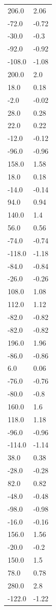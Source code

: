 \begin{longtable}{ll}
206.0 & 2.06 \\
-72.0 & -0.72 \\
-30.0 & -0.3 \\
-92.0 & -0.92 \\
-108.0 & -1.08 \\
200.0 & 2.0 \\
18.0 & 0.18 \\
-2.0 & -0.02 \\
28.0 & 0.28 \\
22.0 & 0.22 \\
-12.0 & -0.12 \\
-96.0 & -0.96 \\
158.0 & 1.58 \\
18.0 & 0.18 \\
-14.0 & -0.14 \\
94.0 & 0.94 \\
140.0 & 1.4 \\
56.0 & 0.56 \\
-74.0 & -0.74 \\
-118.0 & -1.18 \\
-84.0 & -0.84 \\
-26.0 & -0.26 \\
108.0 & 1.08 \\
112.0 & 1.12 \\
-82.0 & -0.82 \\
-82.0 & -0.82 \\
196.0 & 1.96 \\
-86.0 & -0.86 \\
6.0 & 0.06 \\
-76.0 & -0.76 \\
-80.0 & -0.8 \\
160.0 & 1.6 \\
118.0 & 1.18 \\
-96.0 & -0.96 \\
-114.0 & -1.14 \\
38.0 & 0.38 \\
-28.0 & -0.28 \\
82.0 & 0.82 \\
-48.0 & -0.48 \\
-98.0 & -0.98 \\
-16.0 & -0.16 \\
156.0 & 1.56 \\
-20.0 & -0.2 \\
150.0 & 1.5 \\
78.0 & 0.78 \\
280.0 & 2.8 \\
-122.0 & -1.22 \\

\end{longtable}

